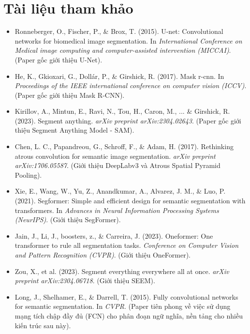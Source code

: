 \section*{Tài liệu tham khảo}
\begin{itemize}
	\item[1] Ronneberger, O., Fischer, P., \& Brox, T. (2015). U-net: Convolutional networks for biomedical image segmentation. In \textit{International Conference on Medical image computing and computer-assisted intervention (MICCAI)}. (Paper gốc giới thiệu U-Net).
	\item[2] He, K., Gkioxari, G., Dollár, P., \& Girshick, R. (2017). Mask r-cnn. In \textit{Proceedings of the IEEE international conference on computer vision (ICCV)}. (Paper gốc giới thiệu Mask R-CNN).
	\item[3] Kirillov, A., Mintun, E., Ravi, N., Tou, H., Caron, M., ... \& Girshick, R. (2023). Segment anything. \textit{arXiv preprint arXiv:2304.02643}. (Paper gốc giới thiệu Segment Anything Model - SAM).
	\item[4] Chen, L. C., Papandreou, G., Schroff, F., \& Adam, H. (2017). Rethinking atrous convolution for semantic image segmentation. \textit{arXiv preprint arXiv:1706.05587}. (Giới thiệu DeepLabv3 và Atrous Spatial Pyramid Pooling).
	\item[5] Xie, E., Wang, W., Yu, Z., Anandkumar, A., Alvarez, J. M., \& Luo, P. (2021). Segformer: Simple and efficient design for semantic segmentation with transformers. In \textit{Advances in Neural Information Processing Systems (NeurIPS)}. (Giới thiệu SegFormer).
	\item[6] Jain, J., Li, J., boosters, z., \& Carreira, J. (2023). Oneformer: One transformer to rule all segmentation tasks. \textit{Conference on Computer Vision and Pattern Recognition (CVPR)}. (Giới thiệu OneFormer).
	\item[7] Zou, X., et al. (2023). Segment everything everywhere all at once. \textit{arXiv preprint arXiv:2304.06718}. (Giới thiệu SEEM).
	\item[8] Long, J., Shelhamer, E., \& Darrell, T. (2015). Fully convolutional networks for semantic segmentation. In \textit{CVPR}. (Paper tiên phong về việc sử dụng mạng tích chập đầy đủ (FCN) cho phân đoạn ngữ nghĩa, nền tảng cho nhiều kiến trúc sau này).
\end{itemize}